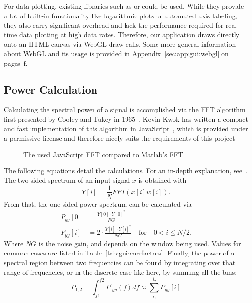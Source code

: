 For   data  plotting,   existing   libraries  such   as     or
  could  be   used. While  they  provide  a   lot  of  built-in
functionality like  logarithmic plots  or automated  axis labeling,  they also
carry significant  overhead and  lack the  performance required  for real-time
data plotting  at high data  rates. Therefore, our application  draws directly
onto an HTML canvas via WebGL draw calls.  Some more general information about
WebGL  and  its  usage  is  provided  in  Appendix~\ref{sec:app:gui:webgl}  on
pages~\pageref{sec:app:gui:webgl}f.
%
%
\subsection{Power Calculation} %
\label{subsec:gui:power_calculation}

Calculating  the spectral  power  of  a signal  is  accomplished  via the  FFT
algorithm first presented by Cooley and Tukey in 1965~\cite{fft:cooley:tukey}.
Kevin Kwok  has written a  compact and  fast implementation of  this algorithm
in  JavaScript~\cite{kwok},  which  is  provided under  a  permissive  license
\cite{kwok:license}  and  therefore  nicely  suits the  requirements  of  this
project.

\begin{figure}
    \centering
    
    \caption[FFT Comparison]{%
        The used JavaScript FFT compared to Matlab's FFT%
    }
    \label{fig:gui:fft_comparison}
\end{figure}

The following equations detail  the calculations. For an in-depth explanation,
see~\cite{gui:hanspi}.   The two-sided  spectrum  of an  input  signal $x$  is
obtained with
\begin{equation}
    Y[i] = \frac{1}{N}FFT\left(x[i]w[i]\right).
    \label{eq:gui:onesidedf}
\end{equation}
From that, the one-sided power spectrum can be calculated via
\begin{align}
    P_{yy}[0] &= \frac{Y[0]\cdot Y[0]^*}{NG} \nonumber\\
    P_{yy}[i] &= 2\cdot\frac{Y[i]\cdot Y[i]^*}{NG} \quad \text{for} \quad 0 < i \leq N / 2.
    \label{eq:gui:onesidedp}
\end{align}
Where $NG$ is the noise gain, and depends on the window being used. Values for
common  cases are  listed  in  Table~\ref{tab:gui:corrfactors}.  Finally,  the
power of a spectral region between two frequencies can be found by integrating
over that range of frequencies, or in  the discrete case like here, by summing
all the bins:
\begin{equation}
    P_{1,2} = \int_{f1}^{f2} P'_{yy}(f)df \approx \sum_{i_1}^{i_2}P_{yy}[i]
    \label{eq:gui:power}
\end{equation}


